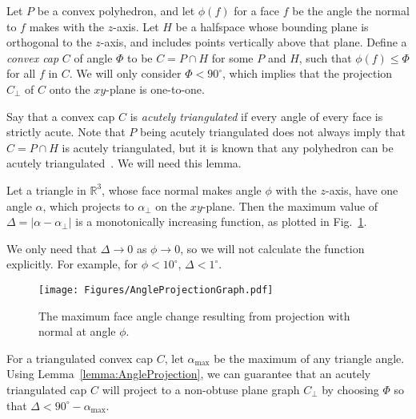 \documentclass{cccg17}
\newcommand{\bluenew}[1]{{#1}}  %
\newcommand{\rednote}[1]{{}}  %
\newcommand{\lemlab}[1]{\label{lemma:#1}}
\newcommand{\figlab}[1]{\label{fig:#1}}
\newcommand{\lemref}[1]{\ref{lemma:#1}}
\newcommand{\figref}[1]{\ref{fig:#1}}
\def\D{{\Delta}}
\def\a{{\alpha}}
\begin{document}
Let $P$ be a convex polyhedron, and let $\phi(f)$ for a face $f$ be
the angle the normal to $f$ makes with the $z$-axis.
Let $H$ be a halfspace whose bounding plane is orthogonal to the $z$-axis, and includes points
vertically above that plane.
Define a \emph{convex cap} $C$ of angle $\Phi$ to be $C=P \cap H$
for some $P$ and $H$, such that $\phi(f) \le \Phi$ for all $f$ in $C$.
We will only consider $\Phi < 90^\circ$, which implies that the projection
$C_\bot$ of $C$ onto the $xy$-plane is one-to-one.

Say that a convex cap $C$ is \emph{acutely triangulated}
if every angle of every face is strictly acute.
Note that $P$ being acutely triangulated does not always imply that 
$C=P \cap H$ is acutely triangulated,
\rednote{Rev1:
``By cutting a simplicial polyhedron with a plane, you might get some faces which are quadrilaterals and not triangles. In there your angles have to be $\ge 90^\circ$. Is there anything that needs to be said about that?"
JOR: No, because the assumption is that $P$ is acutely triangulated, not that some procedure
gives it to us acutely triangulated. (And obtuse angles could be easily acutely triangulated.)
Oh, OK, will cite Bishop.}
\bluenew{
but it is known that any polyhedron can be acutely triangulated~\cite{bishop2016nonobtuse}.}
We will need this lemma.
\begin{lemma}
Let a triangle in $\mathbb{R}^3$, whose face normal makes angle $\phi$
with the \bluenew{$z$-axis}, have one angle $\a$, which projects to $\a_\bot$ on the $xy$-plane.
Then the maximum value of $\D = | \a - \a_\bot |$
is a monotonically increasing function, as plotted in Fig.~\figref{AngleProjectionGraph}.
\lemlab{AngleProjection}
\end{lemma}
We only need that $\D \to 0$ as $\phi \to 0$, so we will not calculate the function explicitly.
For example, for $\phi < 10^\circ$, $\D < 1^\circ$. 
\begin{figure}[htbp]
\centering
\texttt{[image: Figures/AngleProjectionGraph.pdf]}
\caption{The maximum face angle change resulting from projection with normal
at angle $\phi$.}
\figlab{AngleProjectionGraph}
\end{figure}

For a triangulated convex cap $C$, let $\a_\textrm{max}$ be the maximum of any triangle angle.
Using Lemma~\lemref{AngleProjection}, we can guarantee that an acutely triangulated
cap $C$ will project to a non-obtuse plane graph $C_\bot$ 
by choosing $\Phi$ so that $\D < 90^\circ - \a_\textrm{max}$.
\end{document}
